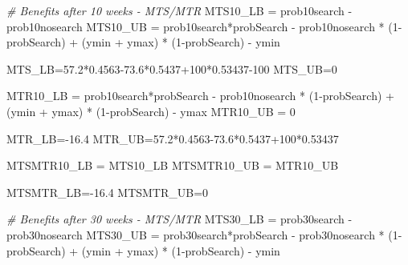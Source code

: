 \documentclass[
]{article}
\newenvironment{Shaded}{\begin{snugshade}}{\end{snugshade}}
\newcommand{\CommentTok}[1]{\textcolor[rgb]{0.56,0.35,0.01}{\textit{#1}}}
\newcommand{\DecValTok}[1]{\textcolor[rgb]{0.00,0.00,0.81}{#1}}
\newcommand{\FloatTok}[1]{\textcolor[rgb]{0.00,0.00,0.81}{#1}}
\newcommand{\NormalTok}[1]{#1}
\newcommand{\OtherTok}[1]{\textcolor[rgb]{0.56,0.35,0.01}{#1}}
\newcommand{\SpecialCharTok}[1]{\textcolor[rgb]{0.00,0.00,0.00}{#1}}
\begin{document}
\begin{Shaded}
\begin{Highlighting}[]
\CommentTok{\# Benefits after 10 weeks {-} MTS/MTR}
\NormalTok{MTS10\_LB }\OtherTok{=}\NormalTok{ prob10search }\SpecialCharTok{{-}}\NormalTok{ prob10nosearch}
\NormalTok{MTS10\_UB }\OtherTok{=}\NormalTok{ prob10search}\SpecialCharTok{*}\NormalTok{probSearch }\SpecialCharTok{{-}}\NormalTok{ prob10nosearch }\SpecialCharTok{*}\NormalTok{ (}\DecValTok{1}\SpecialCharTok{{-}}\NormalTok{probSearch) }\SpecialCharTok{+}\NormalTok{ (ymin }\SpecialCharTok{+}\NormalTok{ ymax) }\SpecialCharTok{*}\NormalTok{ (}\DecValTok{1}\SpecialCharTok{{-}}\NormalTok{probSearch) }\SpecialCharTok{{-}}\NormalTok{ ymin}
  
\NormalTok{MTS\_LB}\OtherTok{=}\FloatTok{57.2}\SpecialCharTok{*}\FloatTok{0.4563{-}73.6}\SpecialCharTok{*}\FloatTok{0.5437}\SpecialCharTok{+}\DecValTok{100}\SpecialCharTok{*}\FloatTok{0.53437}\DecValTok{{-}100}
\NormalTok{MTS\_UB}\OtherTok{=}\DecValTok{0}

\NormalTok{MTR10\_LB }\OtherTok{=}\NormalTok{ prob10search}\SpecialCharTok{*}\NormalTok{probSearch }\SpecialCharTok{{-}}\NormalTok{ prob10nosearch }\SpecialCharTok{*}\NormalTok{ (}\DecValTok{1}\SpecialCharTok{{-}}\NormalTok{probSearch) }\SpecialCharTok{+}\NormalTok{ (ymin }\SpecialCharTok{+}\NormalTok{ ymax) }\SpecialCharTok{*}\NormalTok{ (}\DecValTok{1}\SpecialCharTok{{-}}\NormalTok{probSearch) }\SpecialCharTok{{-}}\NormalTok{ ymax}
\NormalTok{MTR10\_UB }\OtherTok{=} \DecValTok{0}

\NormalTok{MTR\_LB}\OtherTok{=}\SpecialCharTok{{-}}\FloatTok{16.4}
\NormalTok{MTR\_UB}\OtherTok{=}\FloatTok{57.2}\SpecialCharTok{*}\FloatTok{0.4563{-}73.6}\SpecialCharTok{*}\FloatTok{0.5437}\SpecialCharTok{+}\DecValTok{100}\SpecialCharTok{*}\FloatTok{0.53437}

\NormalTok{MTSMTR10\_LB }\OtherTok{=}\NormalTok{ MTS10\_LB}
\NormalTok{MTSMTR10\_UB }\OtherTok{=}\NormalTok{ MTR10\_UB}

\NormalTok{MTSMTR\_LB}\OtherTok{=}\SpecialCharTok{{-}}\FloatTok{16.4}
\NormalTok{MTSMTR\_UB}\OtherTok{=}\DecValTok{0}

\CommentTok{\# Benefits after 30 weeks {-} MTS/MTR}
\NormalTok{MTS30\_LB }\OtherTok{=}\NormalTok{ prob30search }\SpecialCharTok{{-}}\NormalTok{ prob30nosearch}
\NormalTok{MTS30\_UB }\OtherTok{=}\NormalTok{ prob30search}\SpecialCharTok{*}\NormalTok{probSearch }\SpecialCharTok{{-}}\NormalTok{ prob30nosearch }\SpecialCharTok{*}\NormalTok{ (}\DecValTok{1}\SpecialCharTok{{-}}\NormalTok{probSearch) }\SpecialCharTok{+}\NormalTok{ (ymin }\SpecialCharTok{+}\NormalTok{ ymax) }\SpecialCharTok{*}\NormalTok{ (}\DecValTok{1}\SpecialCharTok{{-}}\NormalTok{probSearch) }\SpecialCharTok{{-}}\NormalTok{ ymin}
  

\end{Highlighting}
\end{Shaded}
\end{document}
